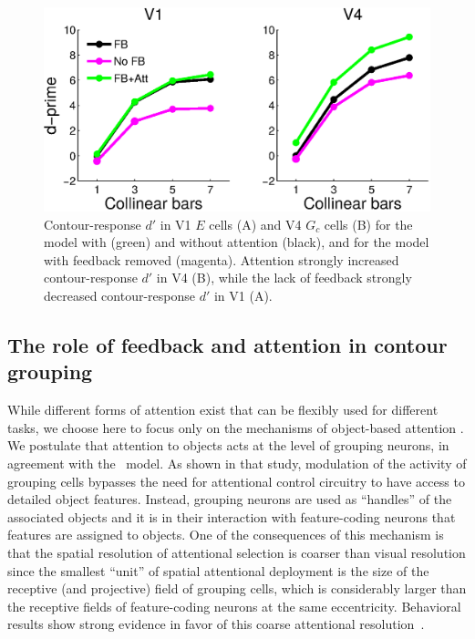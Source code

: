 \begin{figure}[t]
\centering
\includegraphics[width=\textwidth]{Contour/figs/Fig5.eps}
\makeatletter
\let\@currsize\normalsize
\caption[Model prediction of the effect of feedback and attention on contour-response d-prime]{Contour-response $d'$ in V1 $E$ cells (A) and V4 $G_c$ cells (B) for the model with (green) and without attention (black), and for the model with feedback removed (magenta). Attention strongly increased
contour-response $d'$ in V4 (B), while the lack of feedback strongly
decreased contour-response $d'$ in V1 (A).}
\label{Fig:FB_att}
\end{figure}

\subsection{The role of feedback and attention in contour grouping}   

While different forms of attention exist that can be flexibly used for
different tasks, we choose here to focus only on the mechanisms of
object-based attention
\citep{Egly_etal94,Scholl01,Kimchi_etal07,Ho_Yeh09}.  We postulate
that attention to objects acts at the level of grouping neurons, in
agreement with the~\cite{Mihalas_etal11b} model.  As shown in that
study, modulation of the activity of grouping cells bypasses the need
for attentional control circuitry to have access to detailed object
features.  Instead, grouping neurons are used as ``handles'' of the
associated objects and it is in their interaction with feature-coding
neurons that features are assigned to objects. One of the consequences
of this mechanism is that the spatial resolution of attentional
selection is coarser than visual resolution since the smallest
``unit'' of spatial attentional deployment is the size of the
receptive (and projective) field of grouping cells, which is
considerably larger than the receptive fields of feature-coding
neurons at the same eccentricity. Behavioral results show strong
evidence in favor of this coarse attentional
resolution~\citep{Intriligator_Cavanagh01}.

